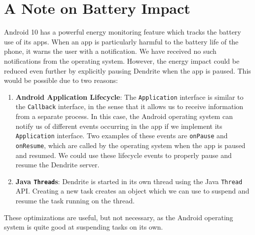 \section*{A Note on Battery Impact}
Android 10 has a powerful energy monitoring feature which tracks the battery use of its apps.
When an app is particularly harmful to the battery life of the phone, it warns the user with a notification.
We have received no such notifications from the operating system.
However, the energy impact could be reduced even further by explicitly pausing Dendrite when the app is paused.
This would be possible due to two reasons:
\begin{enumerate}
	\item{
	      \textbf{Android Application Lifecycle}:
	      The \texttt{Application} interface is similar to the \texttt{Callback} interface, in the sense that it allows us to receive information from a separate process.
	      In this case, the Android operating system can notify us of different events occurring in the app if we implement its \texttt{Application} interface.
	      Two examples of these events are \texttt{onPause} and \texttt{onResume}, which are called by the operating system when the app is paused and resumed.
	      We could use these lifecycle events to properly pause and resume the Dendrite server.
	      }
	\item{
	      \textbf{Java \texttt{Thread}s}:
	      Dendrite is started in its own thread using the Java \texttt{Thread} \ac{API}\@.
	      Creating a new task creates an object which we can use to suspend and resume the task running on the thread.
	      }
\end{enumerate}

These optimizations are useful, but not necessary, as the Android operating system is quite good at suspending tasks on its own.